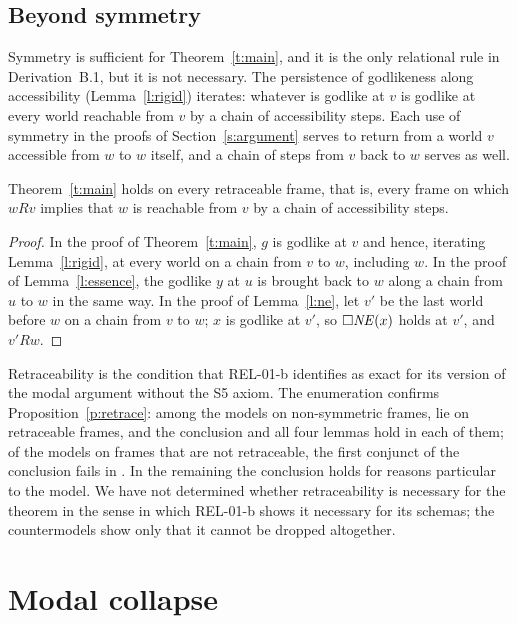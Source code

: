 \documentclass{situationist-preprint}
\newcommand{\NE}{\mathit{NE}}
\begin{document}
\subsection*{Beyond symmetry}

Symmetry is sufficient for Theorem~\ref{t:main}, and it is the only relational rule in Derivation~B.1, but it is not necessary. The persistence of godlikeness along accessibility (Lemma~\ref{l:rigid}) iterates: whatever is godlike at $v$ is godlike at every world reachable from $v$ by a chain of accessibility steps. Each use of symmetry in the proofs of Section~\ref{s:argument} serves to return from a world $v$ accessible from $w$ to $w$ itself, and a chain of steps from $v$ back to $w$ serves as well.

\begin{proposition}\label{p:retrace}
Theorem~\ref{t:main} holds on every retraceable frame, that is, every frame on which $wRv$ implies that $w$ is reachable from $v$ by a chain of accessibility steps.
\end{proposition}

\begin{proof}
In the proof of Theorem~\ref{t:main}, $g$ is godlike at $v$ and hence, iterating Lemma~\ref{l:rigid}, at every world on a chain from $v$ to $w$, including $w$. In the proof of Lemma~\ref{l:essence}, the godlike $y$ at $u$ is brought back to $w$ along a chain from $u$ to $w$ in the same way. In the proof of Lemma~\ref{l:ne}, let $v'$ be the last world before $w$ on a chain from $v$ to $w$; $x$ is godlike at $v'$, so $\nec\NE(x)$ holds at $v'$, and $v' R w$.
\end{proof}

Retraceability is the condition that REL-01-b identifies as exact for its version of the modal argument without the S5 axiom. The enumeration confirms Proposition~\ref{p:retrace}: among the \csNon{} models on non-symmetric frames, \csNonC{} lie on retraceable frames, and the conclusion and all four lemmas hold in each of them; of the \csNonNotC{} models on frames that are not retraceable, the first conjunct of the conclusion fails in \csNonNotCFail{}. In the remaining \csNonNotCOk{} the conclusion holds for reasons particular to the model. We have not determined whether retraceability is necessary for the theorem in the sense in which REL-01-b shows it necessary for its schemas; the countermodels show only that it cannot be dropped altogether.

\section{Modal collapse}\label{s:collapse}
\end{document}
